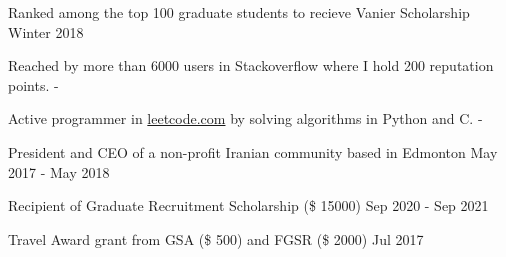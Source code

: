 \documentclass[letter,11pt]{article}
\begin{document}
Ranked among the top 100 graduate students to recieve Vanier Scholarship	\hfill Winter 2018

Reached by more than 6000 users in Stackoverflow where I hold 200 reputation points. \hfill -

Active programmer in \href{www.leetcode.com}{leetcode.com}  by solving algorithms in Python and C. \hfill -

President and CEO of a non-profit Iranian community based in Edmonton \hfill May 2017 - May 2018

Recipient of Graduate Recruitment Scholarship (\$ 15000) \hfill Sep 2020 - Sep 2021

Travel Award grant from GSA (\$ 500) and FGSR (\$ 2000) \hfill Jul 2017
\end{document}
